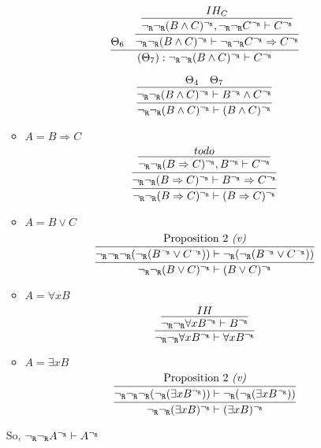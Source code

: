 \begin{enumerate}[(i)]
\begin{itemize}
            $$
            \infer{
                (\Theta_7) : \ngr\ngr(B \wedge C)^\ngr \vdash C^\ngr
            }{
                \Theta_6
                &
                \infer{
                    \ngr\ngr(B \wedge C)^\ngr \vdash \ngr\ngr C^\ngr \Rightarrow  C^\ngr
                }{
                    \infer{
                        \ngr\ngr(B \wedge C)^\ngr, \ngr\ngr C^\ngr \vdash  C^\ngr
                    }{
                        IH_C
                    }
                }
            }
            $$
            
            $$
                \infer{
                    \ngr\ngr(B \wedge C)^\ngr \vdash (B \wedge C)^\ngr
                }{
                    \infer{
                        \ngr\ngr(B \wedge C)^\ngr \vdash B^\ngr \wedge C^\ngr
                    }{
                        \Theta_4
                        &
                        \Theta_7
                    }
                }
            $$
        \item $A=B \Rightarrow C$
            $$
                \infer{
                    \ngr\ngr (B \Rightarrow C)^\ngr \vdash (B \Rightarrow C)^\ngr
                }{
                    \infer{
                        \ngr\ngr (B \Rightarrow C)^\ngr \vdash B^\ngr \Rightarrow C^\ngr
                    }{
                        \infer{
                            \ngr\ngr (B \Rightarrow C)^\ngr, B^\ngr \vdash C^\ngr
                        }{
                            todo
                        }
                    }
                }
            $$
        \item $A=B \vee C$
            $$
                \infer{
                    \ngr\ngr(B \vee C)^\ngr \vdash (B \vee C)^\ngr
                }{
                    \infer{
                        \ngr\ngr\ngr(\ngr(B^\ngr \vee C^\ngr)) \vdash \ngr(\ngr(B^\ngr \vee C^\ngr))
                    }{
                        \text{Proposition 2 \textit{(v)}}
                    }
                }
            $$
        \item $A=\forall x B$
            $$
                \infer{
                    \ngr\ngr \forall x B^\ngr \vdash \forall x B^\ngr
                }{
                    \infer{
                       \ngr\ngr \forall x B^\ngr \vdash B^\ngr
                    }{
                        IH
                    }
                }
            $$
        \item $A=\exists x B$
            $$
                \infer{
                    \ngr\ngr(\exists x B)^\ngr \vdash (\exists x B)^\ngr
                }{
                    \infer{
                        \ngr\ngr\ngr(\ngr(\exists x B^\ngr)) \vdash \ngr(\ngr(\exists x B^\ngr))
                    }{
                        \text{Proposition 2 \textit{(v)}}
                    }
                }
            $$
    \end{itemize}
    So, ${\neg_{\texttt{R}}}{\neg_{\texttt{R}}} A^{\neg_{\texttt{R}}}\vdash A^{\neg_{\texttt{R}}}$
\end{enumerate}
